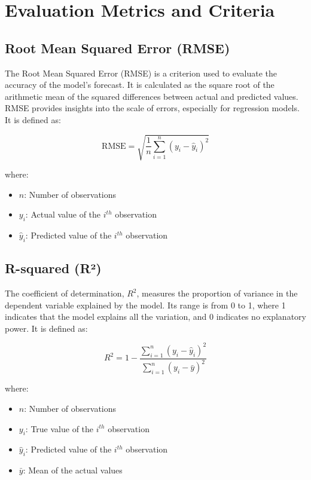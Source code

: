 \section{Evaluation Metrics and Criteria}

\subsection*{Root Mean Squared Error (RMSE)}
The Root Mean Squared Error (RMSE) is a criterion used to evaluate the accuracy of the model’s forecast. It is calculated as the square root of the arithmetic mean of the squared differences between actual and predicted values. RMSE provides insights into the scale of errors, especially for regression models. It is defined as:

\begin{equation}
\text{RMSE} = \sqrt{\frac{1}{n} \sum_{i=1}^{n} (y_i - \hat{y}_i)^2}
\end{equation}

where:
\begin{itemize}
    \item \( n \): Number of observations
    \item \( y_i \): Actual value of the \(i^{th}\) observation
    \item \( \hat{y}_i \): Predicted value of the \(i^{th}\) observation
\end{itemize}

\subsection*{R-squared (R²)}
The coefficient of determination, \(R^2\), measures the proportion of variance in the dependent variable explained by the model. Its range is from 0 to 1, where 1 indicates that the model explains all the variation, and 0 indicates no explanatory power. It is defined as:

\begin{equation}
R^2 = 1 - \frac{\sum_{i=1}^{n} (y_i - \hat{y}_i)^2}{\sum_{i=1}^{n} (y_i - \bar{y})^2}
\end{equation}

where:
\begin{itemize}
    \item \( n \): Number of observations
    \item \( y_i \): True value of the \(i^{th}\) observation
    \item \( \hat{y}_i \): Predicted value of the \(i^{th}\) observation
    \item \( \bar{y} \): Mean of the actual values
\end{itemize}

